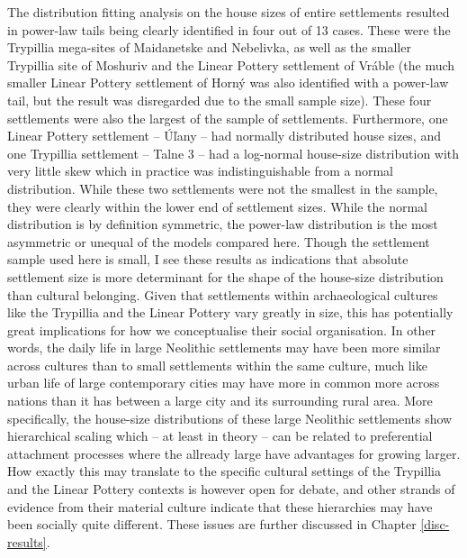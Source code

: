 \documentclass[
  12pt,
]{book}
\begin{document}
The distribution fitting analysis on the house sizes of entire settlements resulted in power-law tails being clearly identified in four out of 13 cases. These were the Trypillia mega-sites of Maidanetske and Nebelivka, as well as the smaller Trypillia site of Moshuriv and the Linear Pottery settlement of Vráble (the much smaller Linear Pottery settlement of Horný was also identified with a power-law tail, but the result was disregarded due to the small sample size). These four settlements were also the largest of the sample of settlements. Furthermore, one Linear Pottery settlement -- Úľany -- had normally distributed house sizes, and one Trypillia settlement -- Talne 3 -- had a log-normal house-size distribution with very little skew which in practice was indistinguishable from a normal distribution. While these two settlements were not the smallest in the sample, they were clearly within the lower end of settlement sizes. While the normal distribution is by definition symmetric, the power-law distribution is the most asymmetric or unequal of the models compared here. Though the settlement sample used here is small, I see these results as indications that absolute settlement size is more determinant for the shape of the house-size distribution than cultural belonging. Given that settlements within archaeological cultures like the Trypillia and the Linear Pottery vary greatly in size, this has potentially great implications for how we conceptualise their social organisation. In other words, the daily life in large Neolithic settlements may have been more similar across cultures than to small settlements within the same culture, much like urban life of large contemporary cities may have more in common more across nations than it has between a large city and its surrounding rural area. More specifically, the house-size distributions of these large Neolithic settlements show hierarchical scaling which -- at least in theory -- can be related to preferential attachment processes where the allready large have advantages for growing larger. How exactly this may translate to the specific cultural settings of the Trypillia and the Linear Pottery contexts is however open for debate, and other strands of evidence from their material culture indicate that these hierarchies may have been socially quite different. These issues are further discussed in Chapter \ref{disc-results}.
\end{document}
